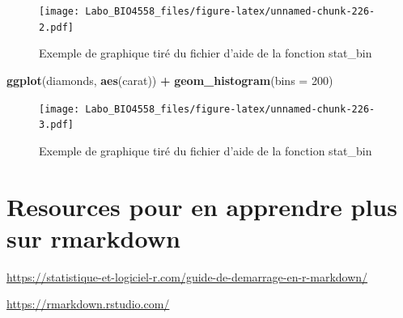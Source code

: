 \documentclass[12pt,]{book}
\newenvironment{Shaded}{\begin{snugshade}}{\end{snugshade}}
\newcommand{\DataTypeTok}[1]{\textcolor[rgb]{0.27,0.27,0.27}{#1}}
\newcommand{\DecValTok}[1]{\textcolor[rgb]{0.06,0.06,0.06}{#1}}
\newcommand{\KeywordTok}[1]{\textcolor[rgb]{0.27,0.27,0.27}{\textbf{#1}}}
\newcommand{\NormalTok}[1]{#1}
\newcommand{\OperatorTok}[1]{\textcolor[rgb]{0.43,0.43,0.43}{\textbf{#1}}}
\newcommand{\StringTok}[1]{\textcolor[rgb]{0.5,0.5,0.5}{#1}}
\begin{document}
\begin{figure}
\centering
\texttt{[image: Labo\_BIO4558\_files/figure-latex/unnamed-chunk-226-2.pdf]}
\caption{\label{fig:unnamed-chunk-226-2}Exemple de graphique tiré du fichier d'aide de la fonction stat\_bin}
\end{figure}

\begin{Shaded}
\begin{Highlighting}[]
\KeywordTok{ggplot}\NormalTok{(diamonds, }\KeywordTok{aes}\NormalTok{(carat)) }\OperatorTok{+}
\StringTok{  }\KeywordTok{geom_histogram}\NormalTok{(}\DataTypeTok{bins =} \DecValTok{200}\NormalTok{)}
\end{Highlighting}
\end{Shaded}

\begin{figure}
\centering
\texttt{[image: Labo\_BIO4558\_files/figure-latex/unnamed-chunk-226-3.pdf]}
\caption{\label{fig:unnamed-chunk-226-3}Exemple de graphique tiré du fichier d'aide de la fonction stat\_bin}
\end{figure}

\hypertarget{resources-pour-en-apprendre-plus-sur-rmarkdown}{%
\chapter{Resources pour en apprendre plus sur rmarkdown}\label{resources-pour-en-apprendre-plus-sur-rmarkdown}}

\url{https://statistique-et-logiciel-r.com/guide-de-demarrage-en-r-markdown/}

\url{https://rmarkdown.rstudio.com/}

\printindex
\end{document}

